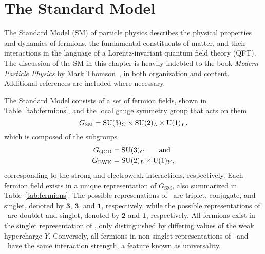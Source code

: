 \chapter{The Standard Model}
\label{sec:sm}

The Standard Model (SM) of particle physics describes the physical properties and dynamics of fermions, the fundamental constituents of matter, and their interactions in the language of a Lorentz-invariant quantum field theory (QFT).
The discussion of the SM in this chapter is heavily indebted to the book \textit{Modern Particle Physics} by Mark Thomson~\cite{thomson}, in both organization and content.
Additional references are included where necessary.

The Standard Model consists of a set of fermion fields, shown in Table~\ref{tab:fermions}, and the local gauge symmetry group that acts on them
\begin{equation}
  G_{\text{SM}} = \text{SU}(3)_C \times \text{SU}(2)_L \times \text{U}(1)_Y,
\end{equation}
which is composed of the subgroups
\begin{align}
  G_{\text{QCD}} & = \text{SU}(3)_C \qquad \text{and} \nonumber \\
  G_{\text{EWK}} & = \text{SU}(2)_L \times \text{U}(1)_Y,
\end{align}
corresponding to the strong and electroweak interactions, respectively.
Each fermion field exists in a unique representation of $G_{\text{SM}}$, also summarized in Table~\ref{tab:fermions}.
The possible represenations of \suthree\ are triplet, conjugate, and singlet, denoted by $\mathbf{3}$, $\mathbf{\bar{3}}$, and $\mathbf{1}$, respectively, while the possible representations of \sutwo\ are doublet and singlet, denoted by $\mathbf{2}$ and $\mathbf{1}$, respectively.
All fermions exist in the singlet representation of \uone, only distinguished by differing values of the weak hypercharge $Y$.
Conversely, all fermions in non-singlet representations of \suthree\ and \sutwo\ have the same interaction strength, a feature known as universality.

